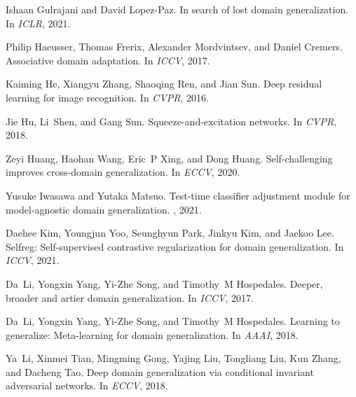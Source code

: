 \documentclass{article}
\begin{document}
\begin{thebibliography}{}
Ishaan Gulrajani and David Lopez-Paz.
\newblock In search of lost domain generalization.
\newblock In {\em ICLR}, 2021.

Philip Haeusser, Thomas Frerix, Alexander Mordvintsev, and Daniel Cremers.
\newblock Associative domain adaptation.
\newblock In {\em ICCV}, 2017.

Kaiming He, Xiangyu Zhang, Shaoqing Ren, and Jian Sun.
\newblock Deep residual learning for image recognition.
\newblock In {\em CVPR}, 2016.

Jie Hu, Li~Shen, and Gang Sun.
\newblock Squeeze-and-excitation networks.
\newblock In {\em CVPR}, 2018.

Zeyi Huang, Haohan Wang, Eric~P Xing, and Dong Huang.
\newblock Self-challenging improves cross-domain generalization.
\newblock In {\em ECCV}, 2020.

Yusuke Iwasawa and Yutaka Matsuo.
\newblock Test-time classifier adjustment module for model-agnostic domain
  generalization.
, 2021.

Daehee Kim, Youngjun Yoo, Seunghyun Park, Jinkyu Kim, and Jaekoo Lee.
\newblock Selfreg: Self-supervised contrastive regularization for domain
  generalization.
\newblock In {\em ICCV}, 2021.

Da~Li, Yongxin Yang, Yi-Zhe Song, and Timothy~M Hospedales.
\newblock Deeper, broader and artier domain generalization.
\newblock In {\em ICCV}, 2017.

Da~Li, Yongxin Yang, Yi-Zhe Song, and Timothy~M Hospedales.
\newblock Learning to generalize: Meta-learning for domain generalization.
\newblock In {\em AAAI}, 2018.

Ya~Li, Xinmei Tian, Mingming Gong, Yajing Liu, Tongliang Liu, Kun Zhang, and
  Dacheng Tao.
\newblock Deep domain generalization via conditional invariant adversarial
  networks.
\newblock In {\em ECCV}, 2018.


\end{thebibliography}
\end{document}
